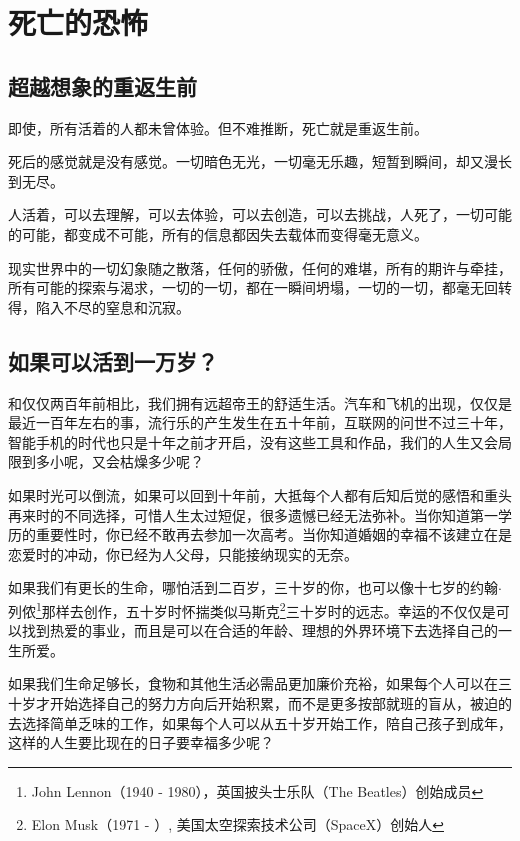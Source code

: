 \section{死亡的恐怖}

\subsection{超越想象的重返生前}

即使，所有活着的人都未曾体验。但不难推断，死亡就是重返生前。

死后的感觉就是没有感觉。一切暗色无光，一切毫无乐趣，短暂到瞬间，却又漫长到无尽。

人活着，可以去理解，可以去体验，可以去创造，可以去挑战，人死了，一切可能的可能，都变成不可能，所有的信息都因失去载体而变得毫无意义。

现实世界中的一切幻象随之散落，任何的骄傲，任何的难堪，所有的期许与牵挂，所有可能的探索与渴求，一切的一切，都在一瞬间坍塌，一切的一切，都毫无回转得，陷入不尽的窒息和沉寂。

\subsection{如果可以活到一万岁？}

和仅仅两百年前相比，我们拥有远超帝王的舒适生活。汽车和飞机的出现，仅仅是最近一百年左右的事，流行乐的产生发生在五十年前，互联网的问世不过三十年，智能手机的时代也只是十年之前才开启，没有这些工具和作品，我们的人生又会局限到多小呢，又会枯燥多少呢？

如果时光可以倒流，如果可以回到十年前，大抵每个人都有后知后觉的感悟和重头再来时的不同选择，可惜人生太过短促，很多遗憾已经无法弥补。当你知道第一学历的重要性时，你已经不敢再去参加一次高考。当你知道婚姻的幸福不该建立在是恋爱时的冲动，你已经为人父母，只能接纳现实的无奈。

如果我们有更长的生命，哪怕活到二百岁，三十岁的你，也可以像十七岁的约翰$\cdot$列侬\footnote{John Lennon（1940 - 1980），英国披头士乐队（The Beatles）创始成员}那样去创作，五十岁时怀揣类似马斯克\footnote{Elon Musk（1971 - ）, 美国太空探索技术公司（SpaceX）创始人}三十岁时的远志。幸运的不仅仅是可以找到热爱的事业，而且是可以在合适的年龄、理想的外界环境下去选择自己的一生所爱。

如果我们生命足够长，食物和其他生活必需品更加廉价充裕，如果每个人可以在三十岁才开始选择自己的努力方向后开始积累，而不是更多按部就班的盲从，被迫的去选择简单乏味的工作，如果每个人可以从五十岁开始工作，陪自己孩子到成年，这样的人生要比现在的日子要幸福多少呢？

